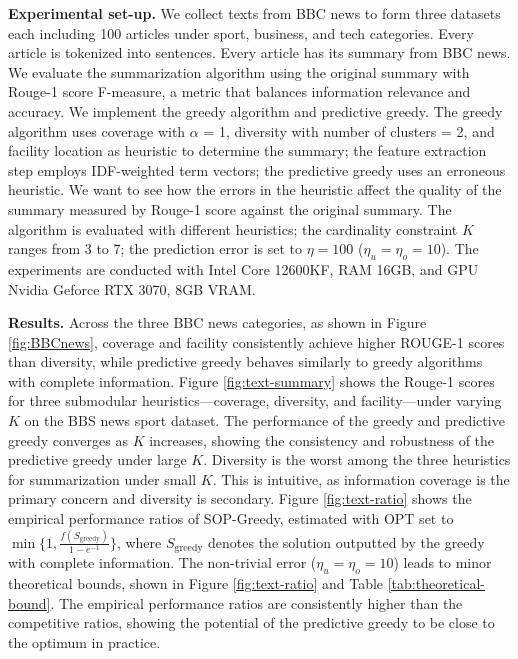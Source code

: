 \textbf{Experimental set-up.}
We collect texts from BBC news \cite{bbcnews_dataset} to form three datasets each including 100 articles under sport, business, and tech categories. Every article is tokenized into sentences. Every article has its summary from BBC news. We evaluate the summarization algorithm using the original summary with Rouge-1 score F-measure, a metric that balances information relevance and accuracy. We implement the greedy algorithm and predictive greedy. The greedy algorithm uses coverage with $\alpha$ = 1, diversity with number of clusters = 2, and facility location as heuristic to determine the summary; the feature extraction step employs IDF-weighted term vectors; the predictive greedy uses an erroneous heuristic. We want to see how the errors in the heuristic affect the quality of the summary measured by Rouge-1 score against the original summary. 
The algorithm is evaluated with different heuristics; the cardinality constraint $K$ ranges from 3 to 7; the prediction error is set to $\eta = 100$ ($\eta_u = \eta_o = 10$). The experiments are conducted with Intel Core 12600KF, RAM 16GB, and GPU Nvidia Geforce RTX 3070, 8GB VRAM. 


\textbf{Results.}
Across the three BBC news categories, as shown in Figure \ref{fig:BBCnews}, coverage and facility consistently achieve higher ROUGE-1 scores than diversity, while predictive greedy behaves similarly to greedy algorithms with complete information. Figure \ref{fig:text-summary} shows the Rouge-1 scores for three submodular heuristics—coverage, diversity, and facility—under varying $K$ on the BBS news sport dataset. The performance of the greedy and predictive greedy converges as $K$ increases, showing the consistency and robustness of the predictive greedy under large $K$. Diversity is the worst among the three heuristics for summarization under small $K$. This is intuitive, as information coverage is the primary concern and diversity is secondary. Figure \ref{fig:text-ratio} shows the empirical performance ratios of SOP-Greedy, estimated with OPT set to $\min \{ 1, \frac{f(S_{\text{greedy}})}{1 - e^{-1}}\}$, where $S_{\text{greedy}}$ denotes the solution outputted by the greedy with complete information. The non-trivial error ($\eta_u = \eta_o = 10$) leads to minor theoretical bounds, shown in Figure \ref{fig:text-ratio} and Table \ref{tab:theoretical-bound}. The empirical performance ratios are consistently higher than the competitive ratios, showing the potential of the predictive greedy to be close to the optimum in practice. 

